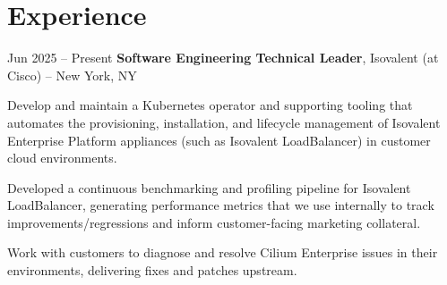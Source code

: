 



\fontsize{9.75pt}{11.7pt}\selectfont
\newcommand{\AND}{\unskip
	\cleaders\copy\ANDbox\hskip\wd\ANDbox
	\ignorespaces
}
\newsavebox\ANDbox
\sbox\ANDbox{$|$}



\vspace{5 pt - 0.3 cm}


\section{Experience}

\begin{twocolentry}{
		Jun 2025 – Present
	}
    \textbf{Software Engineering Technical Leader}, Isovalent (at Cisco) -- New York, NY \end{twocolentry}

\vspace{0.10 cm}
\begin{onecolentry}
	\begin{highlights}
        \item Develop and maintain a Kubernetes operator and supporting tooling that automates the provisioning, installation, and lifecycle management of Isovalent Enterprise Platform appliances (such as Isovalent LoadBalancer) in customer cloud environments.
        \item Developed a continuous benchmarking and profiling pipeline for Isovalent LoadBalancer, generating performance metrics that we use internally to track improvements/regressions and inform customer-facing marketing collateral.
        \item Work with customers to diagnose and resolve Cilium Enterprise issues in their environments, delivering fixes and patches upstream.
	\end{highlights}
\end{onecolentry}

